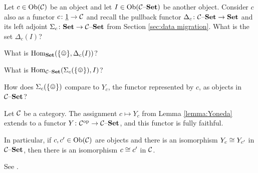 \documentclass[CT4S-EN-RU]{subfiles}
\begin{document}
\begin{exampleRUS}\label{ex:yoneda for cyclic monoid}
\end{exampleRUS}

\begin{exerciseENG}
Let $c\in\textnormal{Ob}(\mathcal{C})$ be an object and let $I\in\textnormal{Ob}(\mathcal{C}{\text \textendash}{\bf Set})$ be another object. Consider $c$ also as a functor $c\colon\underline{1}\rightarrow\mathcal{C}$ and recall the pullback functor $\Delta_c\colon\mathcal{C}{\text \textendash}{\bf Set}\rightarrow{\bf Set}$ and its left adjoint $\Sigma_c\colon{\bf Set}\rightarrow\mathcal{C}{\text \textendash}{\bf Set}$ from Section \ref{sec:data migration}.
\sexc What is the set $\Delta_c(I)$?
\item What is $\Hom_\Set(\singleton,\Delta_c(I))$?
\item What is $\Hom_{\mcC\set}(\Sigma_c(\singleton),I)$?
\item How does $\Sigma_c(\singleton)$ compare to $Y_c$, the functor represented by $c$, as objects in $\mathcal{C}{\text \textendash}{\bf Set}$?
\endsexc
\end{exerciseENG}

\begin{exerciseRUS}
\end{exerciseRUS}

\begin{lemmaENG}
Let $\mathcal{C}$ be a category. The assignment $c\mapsto Y_c$ from Lemma \ref{lemma:Yoneda} extends to a functor $Y\colon\mathcal{C}^\textnormal{op}\rightarrow\mathcal{C}{\text \textendash}{\bf Set}$, and this functor is fully faithful. 

In particular, if $c,c'\in\textnormal{Ob}(\mathcal{C})$ are objects and there is an isomorphism $Y_c\cong Y_{c'}$ in $\mathcal{C}{\text \textendash}{\bf Set}$, then there is an isomorphism $c\cong c'$ in $\mathcal{C}$.
\end{lemmaENG}

\begin{lemmaRUS}
\end{lemmaRUS}

\begin{proofENG}
See \cite{Mac}.
\end{proofENG}

\begin{proofRUS}
\end{proofRUS}
\end{document}
